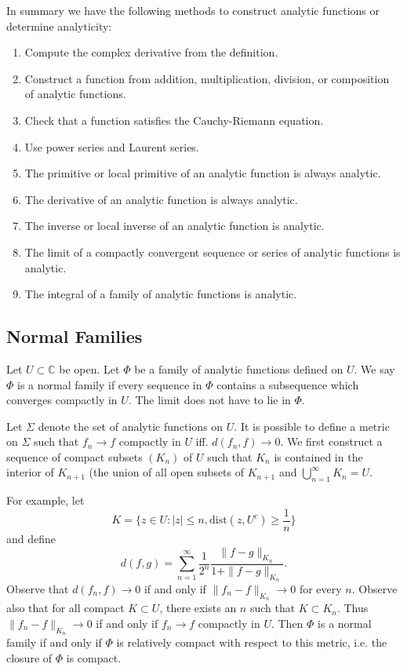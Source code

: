 In summary we have the following methods to construct analytic
functions or determine analyticity:
\begin{enumerate}
  \item{
    Compute the complex derivative from the definition.
  }
  \item{
    Construct a function from addition, multiplication, division, or
    composition of analytic functions.
  }
  \item{
    Check that a function satisfies the Cauchy-Riemann equation.
  }
  \item{
    Use power series and Laurent series.
  }
  \item{
    The primitive or local primitive of an analytic function is always analytic.
  }
  \item{
    The derivative of an analytic function is always analytic.
  }
  \item{
    The inverse or local inverse of an analytic function is analytic.
  }
  \item{
    The limit of a compactly convergent sequence or series of analytic
    functions is analytic.
  }
  \item{
    The integral of a family of analytic functions is analytic.
  }
\end{enumerate}

\subsection{Normal Families}
\begin{defn}
Let $U \subset \mathbb{C}$ be open. Let $\Phi$ be a family of analytic
functions defined on $U$. We say $\Phi$ is a normal family if every
sequence in $\Phi$ contains a subsequence which converges compactly in
$U$. The limit does not have to lie in $\Phi$.
\end{defn}

\begin{remark}
Let $\Sigma$ denote the set of analytic functions on $U$. It is
possible to define a metric on $\Sigma$ such that $f_n \to f$
compactly in $U$ iff. $d(f_n, f) \to 0$. We first construct a sequence
of compact subsets $(K_n)$ of $U$ such that
$K_n$ is contained in the interior of $K_{n+1}$ (the union of all open
subsets of $K_{n+1}$ and $\bigcup_{n=1}^\infty K_n = U$.

For example, let
$$
  K
= \{ z \in U : |z| \leq n,
     \mathrm{dist}(z, U^c) \geq \frac{1}{n} \}
$$
and define
$$
  d(f, g)
= \sum_{n=1}^\infty
    \frac{1}{2^n}
    \frac{\|f - g\|_{K_n}}
         {1 + \|f - g\|_{K_n}}.
$$
Observe that $d(f_n, f) \to 0$ if and only if
$\|f_n - f\|_{K_n} \to 0$ for every $n$.
Observe also that for all compact $K \subset U$, there exists an $n$
such that $K \subset K_n$. Thus $\|f_n - f\|_{K_n} \to 0$ if and only
if $f_n \to f$ compactly in $U$. Then $\Phi$ is a normal family if and
only if $\Phi$ is relatively compact with respect to this metric, i.e.
the closure of $\Phi$ is compact.
\end{remark}

